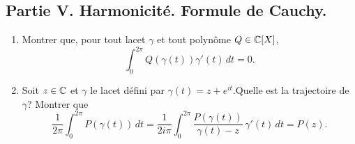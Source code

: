 \subsection*{Partie V. Harmonicité. Formule de Cauchy.}
\begin{enumerate}
 \item Montrer que, pour tout lacet $\gamma$ et tout polynôme $Q\in \mathbb{C}[X]$, 
\[
 \int_{0}^{2\pi}Q(\gamma(t))\gamma'(t)\,dt = 0.
\]
 \item Soit $z\in \mathbb{C}$ et $\gamma$ le lacet défini par $\gamma(t) = z + e^{it}$.\newline Quelle est la trajectoire de $\gamma$? Montrer que
\[
 \frac{1}{2\pi}\int_0^{2\pi}P(\gamma(t))\,dt = \frac{1}{2i\pi}\int_0^{2\pi}\frac{P(\gamma(t))}{\gamma(t) - z}\,\gamma'(t)\,dt = P(z).
\]

\end{enumerate}



